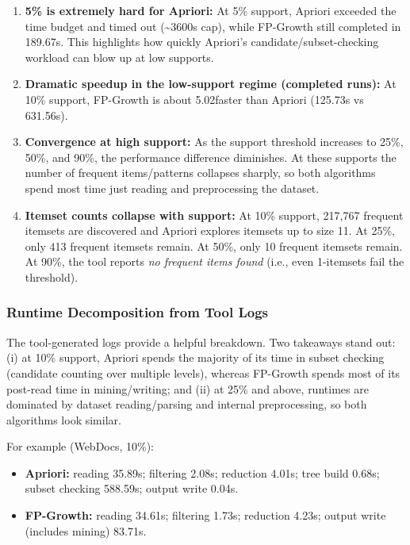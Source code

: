 \documentclass[11pt]{article}
\begin{document}
\begin{enumerate}
    \item \textbf{5\% is extremely hard for Apriori:} At 5\% support, Apriori exceeded the time budget and timed out (\textasciitilde3600s cap), while FP-Growth still completed in 189.67s. This highlights how quickly Apriori's candidate/subset-checking workload can blow up at low supports.

    \item \textbf{Dramatic speedup in the low-support regime (completed runs):} At 10\% support, FP-Growth is about 5.02\texttimes faster than Apriori (125.73s vs 631.56s).
    
    \item \textbf{Convergence at high support:} As the support threshold increases to 25\%, 50\%, and 90\%, the performance difference diminishes. At these supports the number of frequent items/patterns collapses sharply, so both algorithms spend most time just reading and preprocessing the dataset.
    
    \item \textbf{Itemset counts collapse with support:} At 10\% support, 217,767 frequent itemsets are discovered and Apriori explores itemsets up to size 11. At 25\%, only 413 frequent itemsets remain. At 50\%, only 10 frequent itemsets remain. At 90\%, the tool reports \emph{no frequent items found} (i.e., even 1-itemsets fail the threshold).
\end{enumerate}

\subsubsection{Runtime Decomposition from Tool Logs}

The tool-generated logs provide a helpful breakdown. Two takeaways stand out:
(i) at 10\% support, Apriori spends the majority of its time in subset checking (candidate counting over multiple levels), whereas FP-Growth spends most of its post-read time in mining/writing; and
(ii) at 25\% and above, runtimes are dominated by dataset reading/parsing and internal preprocessing, so both algorithms look similar.

For example (WebDocs, 10\%):
\begin{itemize}
    \item \textbf{Apriori:} reading 35.89s; filtering 2.08s; reduction 4.01s; tree build 0.68s; subset checking 588.59s; output write 0.04s.
    \item \textbf{FP-Growth:} reading 34.61s; filtering 1.73s; reduction 4.23s; output write (includes mining) 83.71s.
\end{itemize}
\end{document}
